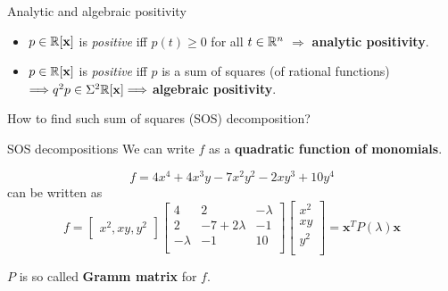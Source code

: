 \begin{frame}{Analytic and algebraic positivity}

\begin{itemize}
  \item $p\in \mathbb{R}[\mathbf{x}]$ is \textit{positive} iff $p(t) \geqslant 0$ for all $t \in\mathbb{R}^n$ $\Longrightarrow $ \textbf{analytic positivity}.
  \item $p\in \mathbb{R}[\mathbf{x}]$ is \textit{positive} iff $p$ is a sum of squares (of rational functions) $\Longrightarrow q^2p\in \Sigma^2 \mathbb{R}[\mathbf{x}] \Longrightarrow $ \textbf{algebraic positivity}.

\end{itemize}
\pause
\begin{problem}
   How to find such sum of squares (SOS) decomposition?
\end{problem}


\end{frame}



\begin{frame}{SOS decompositions}
   \pause
   We can write $f$ as a \textbf{quadratic function of monomials}.

   \begin{example}


   \[
   f = 4x^4 + 4x^3y - 7x^2y^2 - 2xy^3 + 10y^4
   \]
   can be written as
   \[ f =
   \begin{bmatrix}
      x^2, xy, y^2
   \end{bmatrix}
   \begin{bmatrix}
      4         & 2               & -\lambda\\
      2         & -7 + 2\lambda   & -1\\
      -\lambda  & -1              & 10\\
   \end{bmatrix}
   \begin{bmatrix}
    x^2 \\
    xy \\
    y^2 \\
   \end{bmatrix}
   = \mathbf{x}^T P(\lambda) \mathbf{x}
   \]
   \end{example}
   \pause
   $P$ is so called \textbf{Gramm matrix} for $f$.

\end{frame}

